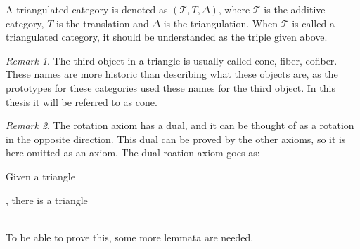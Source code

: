 \documentclass[11pt]{article}
\theoremstyle{definition}
\theoremstyle{remark}
\newtheorem*{remark}{Remark}
\begin{document}
            A triangulated category is denoted as $(\mathcal{T}, T, \Delta)$, where $\mathcal{T}$ is the additive category, $T$ is the translation and $\Delta$ is the triangulation. When $\mathcal{T}$ is called a triangulated category, it should be understanded as the triple given above.
            \begin{remark}
                The third object in a triangle is usually called cone, fiber, cofiber. These names are more historic than describing what these objects are, as the prototypes for these categories used these names for the third object. In this thesis it will be referred to as cone.
            \end{remark}
            \begin{remark}
                The rotation axiom has a dual, and it can be thought of as a rotation in the opposite direction. This dual can be proved by the other axioms, so it is here omitted as an axiom. The dual roation axiom goes as:

                Given a triangle , there is a triangle  \\ %
                To be able to prove this, some more lemmata are needed.
            \end{remark}
\end{document}
